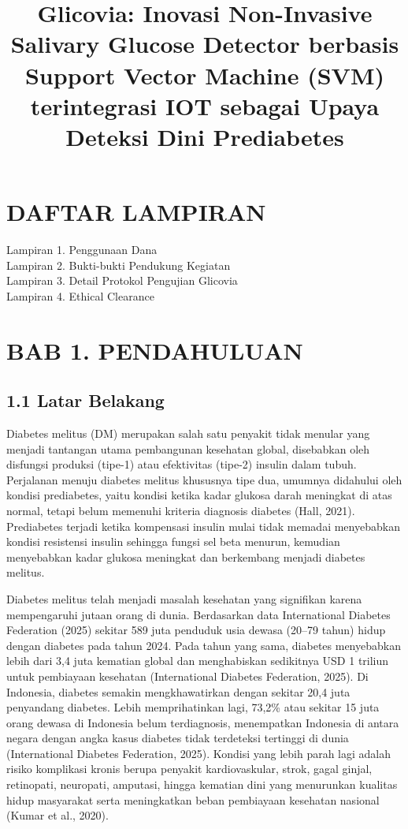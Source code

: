 \documentclass[12pt,a4paper]{article}
\title{\textbf{Glicovia: Inovasi Non-Invasive Salivary Glucose Detector berbasis Support Vector Machine (SVM) terintegrasi IOT sebagai Upaya Deteksi Dini Prediabetes}}
\author{}
\date{}
\begin{document}
\maketitle
\thispagestyle{empty}

\newpage
\tableofcontents
\newpage
\listoffigures
\newpage
\listoftables
\newpage

\section*{DAFTAR LAMPIRAN}
\noindent
Lampiran 1. Penggunaan Dana\\
Lampiran 2. Bukti-bukti Pendukung Kegiatan\\
Lampiran 3. Detail Protokol Pengujian Glicovia\\
Lampiran 4. Ethical Clearance

\newpage

\section*{BAB 1. PENDAHULUAN}

\subsection*{1.1 Latar Belakang}

Diabetes melitus (DM) merupakan salah satu penyakit tidak menular yang menjadi tantangan utama pembangunan kesehatan global, disebabkan oleh disfungsi produksi (tipe-1) atau efektivitas (tipe-2) insulin dalam tubuh. Perjalanan menuju diabetes melitus khususnya tipe dua, umumnya didahului oleh kondisi prediabetes, yaitu kondisi ketika kadar glukosa darah meningkat di atas normal, tetapi belum memenuhi kriteria diagnosis diabetes (Hall, 2021). Prediabetes terjadi ketika kompensasi insulin mulai tidak memadai menyebabkan kondisi resistensi insulin sehingga fungsi sel beta menurun, kemudian menyebabkan kadar glukosa meningkat dan berkembang menjadi diabetes melitus.

Diabetes melitus telah menjadi masalah kesehatan yang signifikan karena mempengaruhi jutaan orang di dunia. Berdasarkan data International Diabetes Federation (2025) sekitar 589 juta penduduk usia dewasa (20--79 tahun) hidup dengan diabetes pada tahun 2024. Pada tahun yang sama, diabetes menyebabkan lebih dari 3,4 juta kematian global dan menghabiskan sedikitnya USD 1 triliun untuk pembiayaan kesehatan (International Diabetes Federation, 2025). Di Indonesia, diabetes semakin mengkhawatirkan dengan sekitar 20,4 juta penyandang diabetes. Lebih memprihatinkan lagi, 73,2\% atau sekitar 15 juta orang dewasa di Indonesia belum terdiagnosis, menempatkan Indonesia di antara negara dengan angka kasus diabetes tidak terdeteksi tertinggi di dunia (International Diabetes Federation, 2025). Kondisi yang lebih parah lagi adalah risiko komplikasi kronis berupa penyakit kardiovaskular, strok, gagal ginjal, retinopati, neuropati, amputasi, hingga kematian dini yang menurunkan kualitas hidup masyarakat serta meningkatkan beban pembiayaan kesehatan nasional (Kumar et al., 2020).
\end{document}

